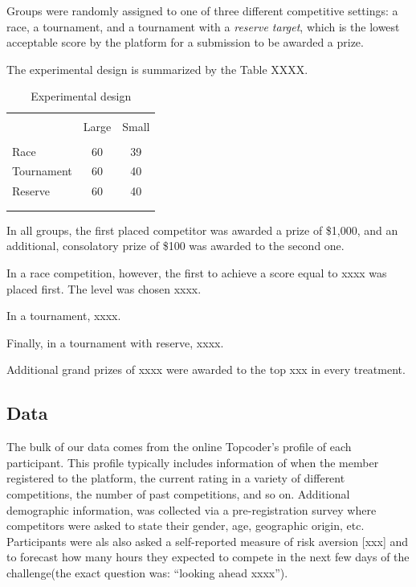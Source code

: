 \documentclass[12pt,]{article}
\theoremstyle{plain} %
\begin{document}
Groups were randomly assigned to one of three different competitive
settings: a race, a tournament, and a tournament with a \emph{reserve
target}, which is the lowest acceptable score by the platform for a
submission to be awarded a prize.

The experimental design is summarized by the Table XXXX.

\begin{table}
\centering
\caption{Experimental design}
\label{tab: experimental design}
\begin{tabular}{@{}lcc}
  \\[-1.8ex]\hline \hline \\[-1.8ex]
 & Large & Small \\ 
  \hline \\[-1.86ex]
Race & 60 & 39 \\ 
  Tournament & 60 & 40 \\ 
  Reserve & 60 & 40 \\ 
   \\[-1.8ex]\hline \hline \\[-1.8ex]
\end{tabular}
\end{table}

In all groups, the first placed competitor was awarded a prize of
\$1,000, and an additional, consolatory prize of \$100 was awarded to
the second one.

In a race competition, however, the first to achieve a score equal to
xxxx was placed first. The level was chosen xxxx.

In a tournament, xxxx.

Finally, in a tournament with reserve, xxxx.

Additional grand prizes of xxxx were awarded to the top xxx in every
treatment.

\subsection{Data}\label{data}

The bulk of our data comes from the online Topcoder's profile of each
participant. This profile typically includes information of when the
member registered to the platform, the current rating in a variety of
different competitions, the number of past competitions, and so on.
Additional demographic information, was collected via a pre-registration
survey where competitors were asked to state their gender, age,
geographic origin, etc. Participants were als also asked a self-reported
measure of risk aversion {[}xxx{]} and to forecast how many hours they
expected to compete in the next few days of the challenge(the exact
question was: ``looking ahead xxxx'').
\end{document}
